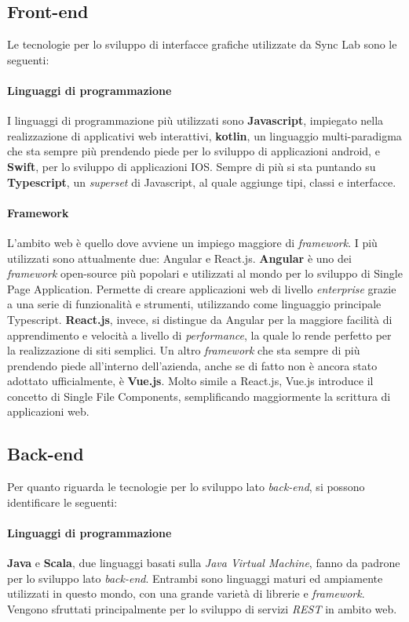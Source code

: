 \subsection{Front-end}
Le tecnologie per lo sviluppo di interfacce grafiche utilizzate da Sync Lab sono le seguenti:

\paragraph{Linguaggi di programmazione} 
I linguaggi di programmazione più utilizzati sono \textbf{Javascript}, impiegato nella realizzazione di applicativi web interattivi, \textbf{kotlin}, un linguaggio multi-paradigma che sta sempre più prendendo piede per lo sviluppo di applicazioni android, e \textbf{Swift}, per lo sviluppo di applicazioni IOS. Sempre di più si sta puntando su \textbf{Typescript}, un \emph{superset} di Javascript, al quale aggiunge tipi, classi e interfacce.

\paragraph{Framework}
L'ambito web è quello dove avviene un impiego maggiore di \emph{framework}. I più utilizzati sono attualmente due: Angular e React.js. \textbf{Angular} è uno dei \emph{framework} open-source più popolari e utilizzati al mondo per lo sviluppo di \gls{Single Page Application}. Permette di creare applicazioni web di livello \emph{enterprise} grazie a una serie di funzionalità e strumenti, utilizzando come linguaggio principale Typescript. \textbf{React.js}, invece, si distingue da Angular per la maggiore facilità di apprendimento e velocità a livello di \emph{performance}, la quale lo rende perfetto per la realizzazione di siti semplici. Un altro \emph{framework} che sta sempre di più prendendo piede all'interno dell'azienda, anche se di fatto non è ancora stato adottato ufficialmente, è \textbf{Vue.js}. Molto simile a React.js, Vue.js introduce il concetto di \gls{Single File Components}, semplificando maggiormente la scrittura di applicazioni web.

\subsection{Back-end}
Per quanto riguarda le tecnologie per lo sviluppo lato \emph{back-end}, si possono identificare le seguenti:

\paragraph{Linguaggi di programmazione}
\textbf{Java} e \textbf{Scala}, due linguaggi basati sulla \emph{Java Virtual Machine}, fanno da padrone per lo sviluppo lato \emph{back-end}. Entrambi sono linguaggi maturi ed ampiamente utilizzati in questo mondo, con una grande varietà di librerie e \emph{framework}. Vengono sfruttati principalmente per lo sviluppo di servizi \emph{REST} in ambito web.

